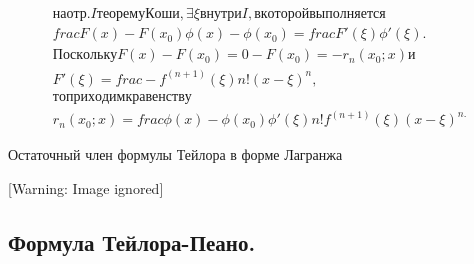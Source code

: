 \documentclass[a4paper]{article}
\begin{document}
\begin{equation*}
\begin{gathered}
\mathit{\text{н}\text{а}}\mathit{\text{о}\text{т}\text{р}.}I\mathit{\text{т}\text{е}\text{о}\text{р}\text{е}\text{м}\text{у}}\mathit{\text{К}\text{о}\text{ш}\text{и}},\exists
\xi
\mathit{\text{в}\text{н}\text{у}\text{т}\text{р}\text{и}}I,\text{в}\mathit{\text{к}\text{о}\text{т}\text{о}\text{р}\text{о}\text{й}}\mathit{\text{в}\text{ы}\text{п}\text{о}\text{л}\text{н}\text{я}\text{е}\text{т}\text{с}\text{я}}\\\mathit{frac}F(x)-F(x_0)\phi
(x)-\phi (x_0)=\mathit{frac}F'(\xi )\phi '(\xi
).\\\mathit{\text{П}\text{о}\text{с}\text{к}\text{о}\text{л}\text{ь}\text{к}\text{у}}F(x)-F(x_0)=0-F(x_0)=-r_n(x_0;x)\text{и}\\F'(\xi
)=\mathit{frac}-f^{(n+1)}(\xi )n!(x-\xi
)^n,\\\mathit{\text{т}\text{о}}\mathit{\text{п}\text{р}\text{и}\text{х}\text{о}\text{д}\text{и}\text{м}}\text{к}\mathit{\text{р}\text{а}\text{в}\text{е}\text{н}\text{с}\text{т}\text{в}\text{у}}\\r_n(x_0;x)=\mathit{frac}\phi
(x)-\phi (x_0)\phi '(\xi )n!f^{(n+1)}(\xi )(x-\xi )^{\mathit{n.}}\end{gathered}
\end{equation*}

\bigskip

Остаточный член формулы Тейлора в форме Лагранжа

  [Warning: Image ignored] %
 

\subsection[Формула Тейлора{}-Пеано.]{Формула Тейлора-Пеано.}

\bigskip


\bigskip
\end{document}
